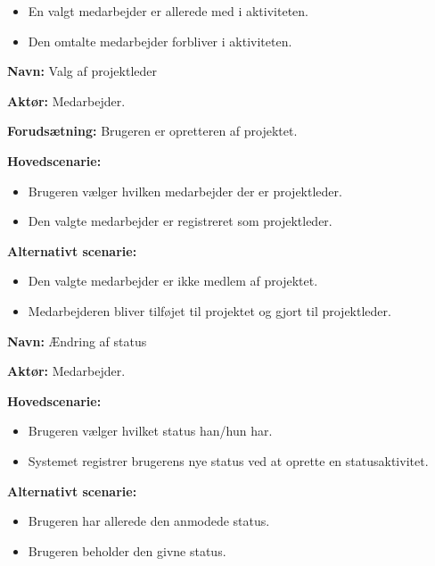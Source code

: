 \begin{itemize}
    \item En valgt medarbejder er allerede med i aktiviteten.
    
        \item Den omtalte medarbejder forbliver i aktiviteten.
    
\end{itemize}

\vspace{1 cm}

\textbf{Navn:} Valg af projektleder

\textbf{Aktør:} Medarbejder.

\textbf{Forudsætning: } Brugeren er opretteren af projektet.

\textbf{Hovedscenarie: }
    
\begin{itemize}
    \item Brugeren vælger hvilken medarbejder der er projektleder.
    \item Den valgte medarbejder er registreret som projektleder.
\end{itemize}

\textbf{Alternativt scenarie:}

\begin{itemize}
    \item Den valgte medarbejder er ikke medlem af projektet.
    \item Medarbejderen bliver tilføjet til projektet og gjort til projektleder.
\end{itemize}

\vspace{1 cm}

\textbf{Navn:} Ændring af status

\textbf{Aktør:} Medarbejder.

\textbf{Hovedscenarie: }
    
\begin{itemize}
    \item Brugeren vælger hvilket status han/hun har.
    \item Systemet registrer brugerens nye status ved at oprette en statusaktivitet.
\end{itemize}

\textbf{Alternativt scenarie:}

\begin{itemize}
    \item Brugeren har allerede den anmodede status.
    \item Brugeren beholder den givne status.
\end{itemize}